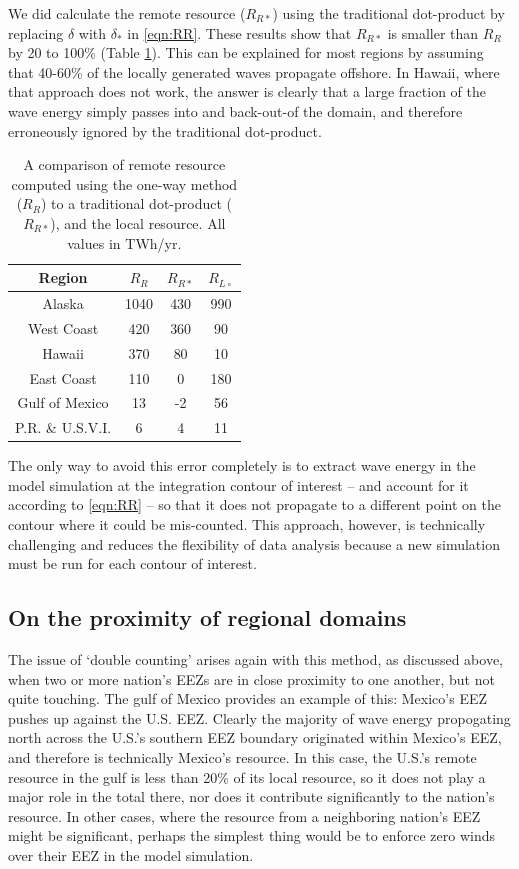We did calculate the remote resource ($R_{R*}$) using the traditional dot-product by replacing $\delta$ with $\delta_*$ in \eqref{eqn:RR}. These results show that $R_{R*}$ is smaller than $R_R$ by 20 to 100\% (Table \ref{tab:RR*}). This can be explained for most regions by assuming that 40-60\% of the locally generated waves propagate offshore. In Hawaii, where that approach does not work, the answer is clearly that a large fraction of the wave energy simply passes into and back-out-of the domain, and therefore erroneously ignored by the traditional dot-product.

\begin{table}[ht]
  \centering
  \begin{tabular}{|c|c|c|c|}
  Region & $R_R$ & $R_{R*}$ & $R_{L\circ}$ \\
  \hline
  Alaska & 1040 & 430 & 990 \\
  West Coast & 420 & 360 & 90 \\
  Hawaii & 370 & 80 & 10 \\
  East Coast & 110 & 0 & 180 \\
  Gulf of Mexico & 13 & -2 & 56 \\
  P.R. \& U.S.V.I. & 6 & 4 & 11 \\
  \end{tabular}
  \label{tab:RR*}
  \caption{A comparison of remote resource computed using the one-way method ($R_R$) to a traditional dot-product ($R_{R*}$), and the local resource. All values in TWh/yr.}
\end{table}

The only way to avoid this error completely is to extract wave energy in the model simulation at the integration contour of interest -- and account for it according to \eqref{eqn:RR} -- so that it does not propagate to a different point on the contour where it could be mis-counted. This approach, however, is technically challenging and reduces the flexibility of data analysis because a new simulation must be run for each contour of interest.

\subsection{On the proximity of regional domains}

The issue of `double counting' arises again with this method, as discussed above, when two or more nation's EEZs are in close proximity to one another, but not quite touching. The gulf of Mexico provides an example of this: Mexico's EEZ pushes up against the U.S. EEZ. Clearly the majority of wave energy propogating north across the U.S.'s southern EEZ boundary originated within Mexico's EEZ, and therefore is technically Mexico's resource. In this case, the U.S.'s remote resource in the gulf is less than 20\% of its local resource, so it does not play a major role in the total there, nor does it contribute significantly to the nation's resource. In other cases, where the resource from a neighboring nation's EEZ might be significant, perhaps the simplest thing would be to enforce zero winds over their EEZ in the model simulation.

